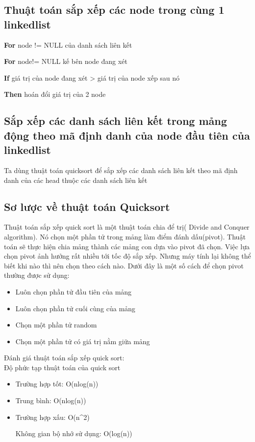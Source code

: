 \documentclass [14pt, a4paper]{report}
\begin{document}
\subsection{Thuật toán sắp xếp các node trong cùng 1 linkedlist}
    \textbf{For}  node != NULL của danh sách liên kết 
    
    
  \hspace{1cm}     	\textbf{For}  node!= NULL kế bên node đang xét 
  
  
       \hspace{2cm}        	\textbf{If} giá trị của node đang xét > giá trị của node xếp sau nó
       
       
            \hspace{3cm}   		\textbf{Then}  hoán đổi giá trị của 2 node 

\subsection{Sắp xếp các danh sách liên kết trong mảng động theo mã định danh của node đầu tiên của linkedlist }
Ta dùng thuật toán quicksort để sắp xếp các danh sách liên kết theo mã định danh của các head thuộc các danh sách liên kết
\subsection{Sơ lược về thuật toán Quicksort}
Thuật toán sắp xếp quick sort là một thuật toán chia để trị( Divide and Conquer algorithm). Nó chọn một phần tử trong mảng làm điểm đánh dấu(pivot). Thuật toán sẽ thực hiện chia mảng thành các mảng con dựa vào pivot đã chọn. Việc lựa chọn pivot ảnh hưởng rất nhiều tới tốc độ sắp xếp. Nhưng máy tính lại không thể biết khi nào thì nên chọn theo cách nào. Dưới đây là một số cách để chọn pivot thường được sử dụng:

\begin{itemize}
\fontsize{13}{18}\selectfont

  \item Luôn chọn phần tử đầu tiên của mảng
  \item Luôn chọn phần tử cuối cùng của mảng
    \item  	Chọn một phần tử random
    \item Chọn một phần tử có giá trị nằm giữa mảng
  
   
\end{itemize}
\setlength{\parindent}{0cm}
\hfill
\hfill

Đánh giá thuật toán sắp xếp quick sort:\\
Độ  phức tạp thuật toán của quick sort
\begin{itemize}
\fontsize{13}{18}\selectfont

  \item 	Trường hợp tốt: O(nlog(n))
  \item Trung bình: O(nlog(n))
    \item  Trường hợp xấu: O(n^2)

  Không gian bộ nhớ sử dụng: O(log(n))
   
\end{itemize}
\end{document}
